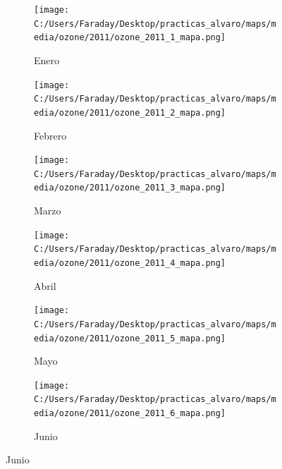 \documentclass[12pt]{article}
\begin{document}
\begin{figure}[H]
\centering
\begin{subfigure}[H]{0.15\textwidth}
\texttt{[image: C:/Users/Faraday/Desktop/practicas\_alvaro/maps/media/ozone/2011/ozone\_2011\_1\_mapa.png]}
\captionsetup{labelformat=empty}
\caption{Enero}
\label{fig:map-ozone-2011-1}
\end{subfigure}
%
\begin{subfigure}[H]{0.15\textwidth}
\texttt{[image: C:/Users/Faraday/Desktop/practicas\_alvaro/maps/media/ozone/2011/ozone\_2011\_2\_mapa.png]}
\captionsetup{labelformat=empty}
\caption{Febrero}
\label{fig:map-ozone-2011-2}
\end{subfigure}
%
\begin{subfigure}[H]{0.15\textwidth}
\texttt{[image: C:/Users/Faraday/Desktop/practicas\_alvaro/maps/media/ozone/2011/ozone\_2011\_3\_mapa.png]}
\captionsetup{labelformat=empty}
\caption{Marzo}
\label{fig:map-ozone-2011-3}
\end{subfigure}
%
\begin{subfigure}[H]{0.15\textwidth}
\texttt{[image: C:/Users/Faraday/Desktop/practicas\_alvaro/maps/media/ozone/2011/ozone\_2011\_4\_mapa.png]}
\captionsetup{labelformat=empty}
\caption{Abril}
\label{fig:map-ozone-2011-4}
\end{subfigure}
%
\begin{subfigure}[H]{0.15\textwidth}
\texttt{[image: C:/Users/Faraday/Desktop/practicas\_alvaro/maps/media/ozone/2011/ozone\_2011\_5\_mapa.png]}
\captionsetup{labelformat=empty}
\caption{Mayo}
\label{fig:map-ozone-2011-5}
\end{subfigure}
%
\begin{subfigure}[H]{0.15\textwidth}
\texttt{[image: C:/Users/Faraday/Desktop/practicas\_alvaro/maps/media/ozone/2011/ozone\_2011\_6\_mapa.png]}
\captionsetup{labelformat=empty}
\caption{Junio}
\label{fig:map-ozone-2011-6}
\end{subfigure}


\end{figure}
\end{document}
